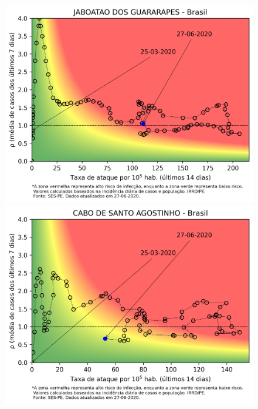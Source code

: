 \documentclass[]{article}
\begin{document}
\begin{figure}[!h]
	\begin{minipage}[t]{4cm}
	\centering
	\includegraphics[scale=0.5]{../JABOATAODOSGUARARAPES.png}
\end{minipage}
\hspace{5cm}
\begin{minipage}[t]{4cm}
	\centering
	\includegraphics[scale=0.5]{../CABODESANTOAGOSTINHO.png}
	\vspace{0.2cm}
\end{minipage}


\end{figure}
\end{document}
